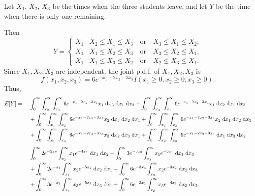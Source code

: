 \documentclass{homework}
\begin{document}
	\maketitle
	
	\question Let $X_1$, $X_2$, $X_3$ be the times when the three students leave, and let $Y$ be the time when there is only one remaining. 
	\begin{alphaparts}
		\questionpart
		Then
		\begin{equation*}
			Y = \begin{cases}
				X_1 & X_2 \le X_1 \le X_3 \quad\text{or}\quad X_3 \le X_1 \le X_2, \\
				X_1 & X_1 \le X_2 \le X_3 \quad\text{or}\quad X_3 \le X_2 \le X_1, \\
				X_1 & X_1 \le X_3 \le X_2 \quad\text{or}\quad X_2 \le X_3 \le X_1.
			\end{cases}
		\end{equation*}
		Since $X_1, X_2, X_3$ are independent, the joint p.d.f. of $X_1, X_2, X_3$ is
		\begin{equation*}
			f(x_1, x_2, x_3) = 6e^{-x_1 -2x_2 -3x_3}I(x_1\ge0, x_2\ge 0, x_3\ge0).
		\end{equation*}
		Thus,
		\begin{alignat*}{2}
		E[Y] &={}&& \int_0^\infty \int_{x_2}^\infty\int_{x_1}^\infty 6e^{-x_1-2x_2-3x_3}x_1 \dee x_3\dee x_1 \dee x_2 + \int_0^\infty \int_{x_3}^\infty\int_{x_1}^\infty 6e^{-x_1-2x_2-3x_3}x_1\dee x_2 \dee x_1 \dee x_3 \\
		&&&{}+ \int_0^\infty \int_{x_1}^\infty\int_{x_2}^\infty 6e^{-x_1-2x_2-3x_3}x_2\dee x_3\dee x_2 \dee x_1 + \int_0^\infty \int_{x_3}^\infty\int_{x_2}^\infty 6e^{-x_1-2x_2-3x_3}x_2\dee x_1 \dee x_2 \dee x_3 \\
		&&&{}+ \int_0^\infty \int_{x_1}^\infty\int_{x_3}^\infty 6e^{-x_1-2x_2-3x_3}x_3\dee x_2\dee x_3 \dee x_1 + \int_0^\infty \int_{x_2}^\infty\int_{x_3}^\infty 6e^{-x_1-2x_2-3x_3}\dee x_1 \dee x_3 \dee x_2 \\[0.5em]
		&={}&& \int_0^\infty  2e^{-2x_2} \int_{x_2}^\infty x_1 e^{-4x_1}\dee x_1 \dee x_2 + \int_0^\infty 3e^{-3x_3}\int_{x_3}^\infty x_1e^{-3x_1} \dee x_1 \dee x_3 \\
		&&&{}+ \int_0^\infty 2e^{-x_1}\int_{x_1}^\infty x_2 e^{-5x_2}\dee x_2 \dee x_1 + \int_0^\infty 6e^{-3x_3}\int_{x_3}^\infty x_2e^{-3x_2}\dee x_2 \dee x_3 \\
		&&&{}+ \int_0^\infty 3e^{-x_1}\int_{x_1}^\infty x_3 e^{-5x_3}\dee x_3 \dee x_1 + \int_0^\infty 6e^{-2x_2}\int_{x_2}^\infty x_3 e^{-4x_3}\dee x_3 \dee x_2 \\[0.5em]

\end{alignat*}
\end{alphaparts}
\end{document}
